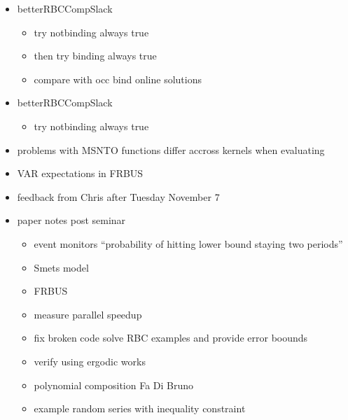 \documentclass[hyperref]{labbook}
\begin{document}
\begin{itemize}
\item betterRBCCompSlack
  \begin{itemize}
  \item try notbinding always true
  \item then try binding always true
  \item compare with occ bind online solutions
  \end{itemize}
\end{itemize}


\begin{itemize}
\item betterRBCCompSlack
  \begin{itemize}
  \item try notbinding always true
  \end{itemize}
\end{itemize}

\begin{itemize}
\item problems with MSNTO  functions differ accross kernels when evaluating
\end{itemize}




\begin{itemize}
\item VAR expectations in FRBUS
\item feedback from Chris after Tuesday November 7
\item paper notes post seminar
  \begin{itemize}
  \item event monitors 
``probability of hitting lower bound staying two periods''
  \item Smets model
  \item FRBUS
  \item measure parallel speedup
  \item fix broken code solve RBC examples and provide error boounds
  \item verify using ergodic works
  \item polynomial composition Fa Di Bruno
  \item example random series with inequality constraint
  \end{itemize}

\end{itemize}
\end{document}
